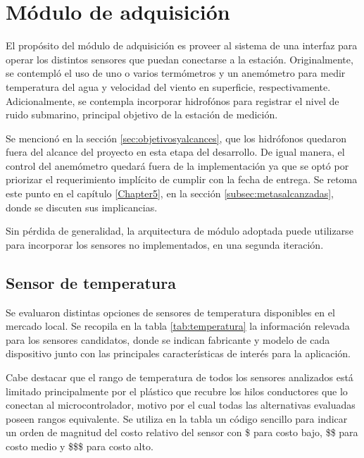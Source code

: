 \clearpage
\section{Módulo de adquisición}
\label{sec:adquisicion}

El propósito del módulo de adquisición es proveer al sistema de una interfaz para operar los distintos sensores que puedan conectarse a la estación.  Originalmente, se contempló el uso de uno o varios termómetros y un anemómetro para medir temperatura del agua y velocidad del viento en superficie, respectivamente. Adicionalmente, se contempla incorporar hidrofónos para registrar el nivel de ruido submarino, principal objetivo de la estación de medición.

Se mencionó en la sección \ref{sec:objetivosyalcances}, que los hidrófonos quedaron fuera del alcance del proyecto en esta etapa del desarrollo.  De igual manera, el control del anemómetro quedará fuera de la implementación ya que se optó por priorizar el requerimiento implícito de cumplir con la fecha de entrega.  Se retoma este punto en el capítulo \ref{Chapter5}, en la sección \ref{subsec:metasalcanzadas}, donde se discuten sus implicancias.

Sin pérdida de generalidad, la arquitectura de módulo adoptada puede utilizarse para incorporar los sensores no implementados, en una segunda iteración.

\subsection{Sensor de temperatura}
\label{subsec:1-wire}


Se evaluaron distintas opciones de sensores de temperatura disponibles en el mercado local.  Se recopila en la tabla \ref{tab:temperatura} la información relevada para los sensores candidatos, donde se indican fabricante y modelo de cada dispositivo junto con las principales características de interés para la aplicación.

Cabe destacar que el rango de temperatura de todos los sensores analizados está limitado principalmente por el plástico que recubre los hilos conductores que lo conectan al microcontrolador, motivo por el cual todas las alternativas evaluadas poseen rangos equivalente.  Se utiliza en la tabla un código sencillo para indicar un orden de magnitud del costo relativo del sensor con \$ para costo bajo, \$\$ para costo medio y \$\$\$ para costo alto.

